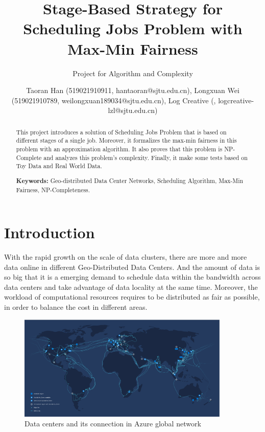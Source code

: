 \documentclass{llncs}
\title{Stage-Based Strategy for Scheduling Jobs Problem with Max-Min Fairness}
\subtitle{Project for Algorithm and Complexity \vspace{-3mm}}
\author{Taoran Han (519021910911, hantaoran@sjtu.edu.cn), Longxuan Wei (519021910789, weilongxuan189034@sjtu.edu.cn), Log Creative (, logcreative-lzl@sjtu.edu.cn)}
\institute{Department of Computer Science, \\ Shanghai Jiao Tong University, Shanghai, China}
\begin{document}



\maketitle
\begin{abstract}\vspace{-5mm}
This project introduces a solution of Scheduling Jobs Problem that is based on different stages of a single job. Moreover, it formalizes the max-min fairness in this problem with an approximation algorithm. It also proves that this problem is NP-Complete and analyzes this problem's complexity. Finally, it make some tests based on Toy Data and Real World Data.

\textbf{Keywords:} Geo-distributed Data Center Networks, Scheduling Algorithm, Max-Min Fairness, NP-Completeness.
\end{abstract}

\section{Introduction}

With the rapid growth on the scale of data clusters, there are more and more data online in different Geo-Distributed Data Centers. And the amount of data is so big that it is a emerging demand to schedule data within the bandwidth across data centers and take advantage of data locality at the same time. Moreover, the workload of computational resources requires to be distributed as fair as possible, in order to balance the cost in different areas.

\begin{figure}[h]
    \centering
    \includegraphics[width=0.9\textwidth]{img/network.png}
    \caption{Data centers and its connection in Azure global network\cite{azure}}
    \label{fig:azure}
\end{figure}
\end{document}
